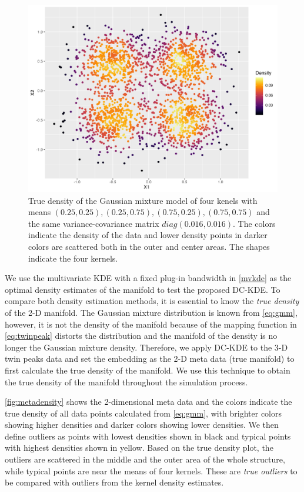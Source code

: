 \documentclass[11pt,a4paper,]{article}
\begin{document}
\begin{figure}

{\centering \includegraphics[width=0.8\linewidth]{figures/truedensity_twinpeaks_dc} 

}

\caption{True density of the Gaussian mixture model of four kenels with means $(0.25, 0.25), (0.25, 0.75), (0.75, 0.25), (0.75, 0.75)$ and the same variance-covariance matrix $diag(0.016, 0.016)$. The colors indicate the density of the data and lower density points in darker colors are scattered both in the outer and center areas. The shapes indicate the four kernels.}\label{fig:metadensity}
\end{figure}

We use the multivariate KDE with a fixed plug-in bandwidth in \autoref{mvkde} as the optimal density estimates of the manifold to test the proposed DC-KDE. To compare both density estimation methods, it is essential to know the \emph{true density} of the 2-D manifold. The Gaussian mixture distribution is known from \eqref{eq:gmm}, however, it is not the density of the manifold because of the mapping function in \autoref{eq:twinpeak} distorts the distribution and the manifold of the density is no longer the Gaussian mixture density. Therefore, we apply DC-KDE to the 3-D twin peaks data and set the embedding as the 2-D meta data (true manifold) to first calculate the true density of the manifold. We use this technique to obtain the true density of the manifold throughout the simulation process.

\autoref{fig:metadensity} shows the 2-dimensional meta data and the colors indicate the true density of all data points calculated from \eqref{eq:gmm}, with brighter colors showing higher densities and darker colors showing lower densities. We then define outliers as points with lowest densities shown in black and typical points with highest densities shown in yellow. Based on the true density plot, the outliers are scattered in the middle and the outer area of the whole structure, while typical points are near the means of four kernels. These are \emph{true outliers} to be compared with outliers from the kernel density estimates.
\end{document}
